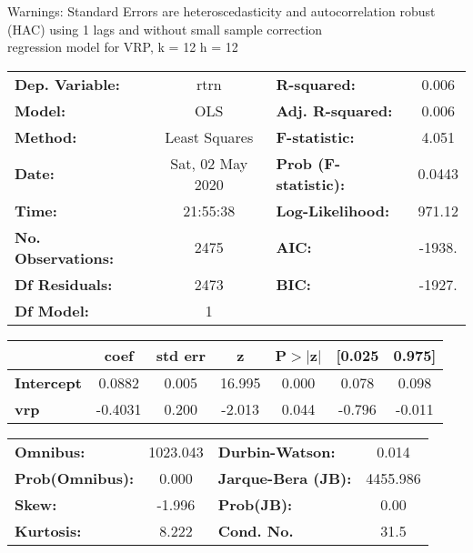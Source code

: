 Warnings: \newline
 [1] Standard Errors are heteroscedasticity and autocorrelation robust (HAC) using 1 lags and without small sample correction\\ 

regression model for VRP, k = 12 h = 12\begin{center}
\begin{tabular}{lclc}
\toprule
\textbf{Dep. Variable:}    &       rtrn       & \textbf{  R-squared:         } &     0.006   \\
\textbf{Model:}            &       OLS        & \textbf{  Adj. R-squared:    } &     0.006   \\
\textbf{Method:}           &  Least Squares   & \textbf{  F-statistic:       } &     4.051   \\
\textbf{Date:}             & Sat, 02 May 2020 & \textbf{  Prob (F-statistic):} &   0.0443    \\
\textbf{Time:}             &     21:55:38     & \textbf{  Log-Likelihood:    } &    971.12   \\
\textbf{No. Observations:} &        2475      & \textbf{  AIC:               } &    -1938.   \\
\textbf{Df Residuals:}     &        2473      & \textbf{  BIC:               } &    -1927.   \\
\textbf{Df Model:}         &           1      & \textbf{                     } &             \\
\bottomrule
\end{tabular}
\begin{tabular}{lcccccc}
                   & \textbf{coef} & \textbf{std err} & \textbf{z} & \textbf{P$> |$z$|$} & \textbf{[0.025} & \textbf{0.975]}  \\
\midrule
\textbf{Intercept} &       0.0882  &        0.005     &    16.995  &         0.000        &        0.078    &        0.098     \\
\textbf{vrp}       &      -0.4031  &        0.200     &    -2.013  &         0.044        &       -0.796    &       -0.011     \\
\bottomrule
\end{tabular}
\begin{tabular}{lclc}
\textbf{Omnibus:}       & 1023.043 & \textbf{  Durbin-Watson:     } &    0.014  \\
\textbf{Prob(Omnibus):} &   0.000  & \textbf{  Jarque-Bera (JB):  } & 4455.986  \\
\textbf{Skew:}          &  -1.996  & \textbf{  Prob(JB):          } &     0.00  \\
\textbf{Kurtosis:}      &   8.222  & \textbf{  Cond. No.          } &     31.5  \\
\bottomrule
\end{tabular}
\end{center}

